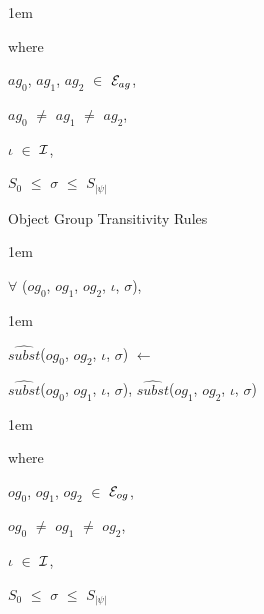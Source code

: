 \documentclass[11pt]{report}
\newenvironment{vquote}
{
  \begin{list}{}{\leftmargin 1em}\item[]
}
{
  \end{list}
}
\begin{document}
\begin{enumerate}
                \begin{vquote}
                  where

                  \hspace{1em}
                  $ag_{0}$, $ag_{1}$, $ag_{2}$ $\in$ ${\cal E}_{ag}$,

                  \hspace{1em}
                  $ag_{0}$ $\neq$ $ag_{1}$ $\neq$ $ag_{2}$,

                  \hspace{1em}
                  $\iota$ $\in$ ${\cal I}$,

                  \hspace{1em}
                  $S_{0}$ $\leq$ $\sigma$ $\leq$ $S_{|\psi|}$
                \end{vquote}
              \item
                Object Group Transitivity Rules

                \begin{vquote}
                  $\forall$ ($og_{0}$, $og_{1}$, $og_{2}$, $\iota$, $\sigma$),
                \end{vquote}

                \begin{vquote}
                  $\hat{subst}$($og_{0}$, $og_{2}$, $\iota$, $\sigma$)
                  $\leftarrow$

                  \hspace{1em}
                  $\hat{subst}$($og_{0}$, $og_{1}$, $\iota$, $\sigma$),
                  $\hat{subst}$($og_{1}$, $og_{2}$, $\iota$, $\sigma$)
                \end{vquote}

                \begin{vquote}
                  where

                  \hspace{1em}
                  $og_{0}$, $og_{1}$, $og_{2}$ $\in$ ${\cal E}_{og}$,

                  \hspace{1em}
                  $og_{0}$ $\neq$ $og_{1}$ $\neq$ $og_{2}$,

                  \hspace{1em}
                  $\iota$ $\in$ ${\cal I}$,

                  \hspace{1em}
                  $S_{0}$ $\leq$ $\sigma$ $\leq$ $S_{|\psi|}$
                \end{vquote}
            \end{enumerate}
\end{document}
